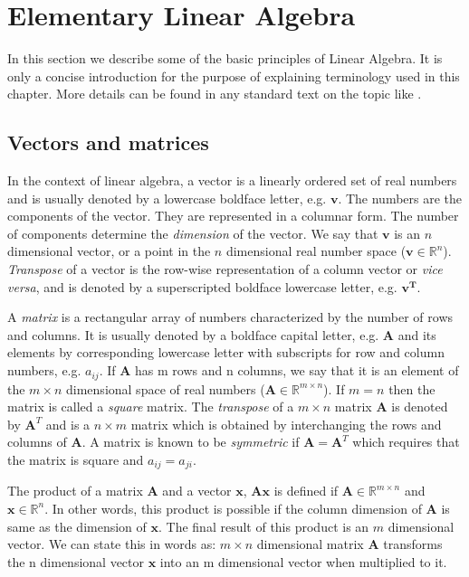 \section{Elementary Linear Algebra} \label{maxent:linalg}
In this section we describe some of the basic principles of Linear Algebra. It is only a concise introduction for the purpose of explaining terminology used in this chapter. More details can be found in any standard text on the topic like \citet{Strang2006Linear, golub1996matrix}.
\subsection{Vectors and matrices}
In the context of linear algebra, a vector is a linearly ordered set of real numbers and is usually denoted by a lowercase boldface letter, e.g. $\mathbf{v}$. The numbers are the components of the vector. They are represented in a columnar form. The number of components determine the \textit{dimension} of the vector. We say that $\mathbf{v}$ is an $n$ dimensional vector, or a point in the $n$ dimensional real number space ($\mathbf{v} \in \mathbb{R}^{n}$).
\textit{Transpose} of a vector is the row-wise representation of a column vector or \textit{vice versa}, and is denoted by a superscripted boldface lowercase letter, e.g. $\mathbf{{v}^{T}}$. 

A \textit{matrix} is a rectangular array of numbers characterized by the number of rows and columns. It is usually denoted by a boldface capital letter, e.g. $\mathbf{A}$ and its elements by corresponding lowercase letter with subscripts for row and column numbers, e.g. $a_{ij}$. If $\mathbf{A}$ has m rows and n columns, we say that it is an element of the $m \times n$ dimensional space of real numbers ($\mathbf{A} \in \mathbb{R}^{m \times n}$). If $m=n$ then the matrix is called a \textit{square} matrix. The \textit{transpose} of a $m \times n$ matrix $\mathbf{A}$ is denoted by $\mathbf{A}^{T}$ and is a $n \times m$ matrix which is obtained by interchanging the rows and columns of $\mathbf{A}$. A matrix is known to be \textit{symmetric} if $\mathbf{A}=\mathbf{A}^{T}$ which requires that the matrix is square and $a_{ij}=a_{ji}$.

The product of a matrix $\mathbf{A}$ and a vector $\mathbf{x}$, $\mathbf{Ax}$ is defined if $\mathbf{A} \in \mathbb{R}^{m \times n}$ and $\mathbf{x} \in \mathbb{R}^{n}$. In other words, this product is possible if the column dimension of $\mathbf{A}$ is same as the dimension of $\mathbf{x}$. The final result of this product is an $m$ dimensional vector. We can state this in words as: $m \times n$ dimensional matrix $\mathbf{A}$ transforms the n dimensional vector $\mathbf{x}$ into an m dimensional vector when multiplied to it.

